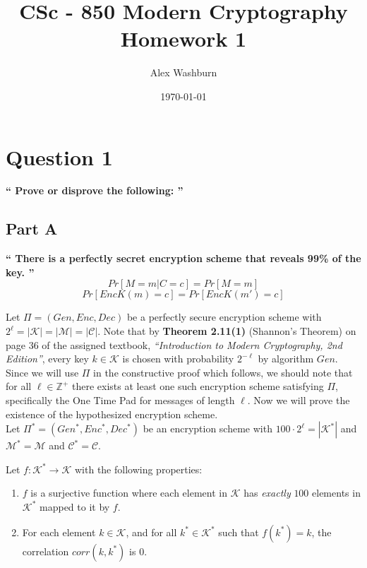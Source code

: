 \documentclass{article}
\title{CSc - 850 Modern Cryptography\\ Homework 1}
\author{Alex Washburn}
\date\today
\newcommand{\HomeworkText}[1]{\textbf{``#1''}\\}
\begin{document}

	\maketitle
	\vspace*{4cm}

	\restoregeometry
	
	\clearpage
	\section*{Question 1}
	\HomeworkText{
		Prove or disprove the following:
	}

	\subsection*{Part A}
	\HomeworkText{
		There is a perfectly secret encryption scheme that reveals 99\% of the key.
	}

    $$Pr[M = m | C = c] = Pr[M = m]$$
    $$Pr[Enc K (m) = c] = Pr[Enc K (m') = c]$$

    Let $\Pi = (Gen,Enc,Dec)$ be a perfectly secure encryption scheme with $2^\ell = |\mathcal{K}| = |\mathcal{M}| = |\mathcal{C}|$.
    Note that by \textbf{Theorem 2.11(1)} (Shannon's Theorem) on page 36 of the assigned textbook, \emph{``Introduction to Modern Cryptography, 2nd Edition''}, every key $k \in \mathcal{K}$ is chosen with probability $2^{-\ell}$ by algorithm $Gen$.
    Since we will use $\Pi$ in the constructive proof which follows, we should note that for all $\ell \in \mathbb{Z}^{+}$ there exists at least one such encryption scheme satisfying $\Pi$, specifically the One Time Pad for messages of length $\ell$.
    Now we will prove the existence of the hypothesized encryption scheme.\\
    
    Let $\Pi^{*} = (Gen^{*},Enc^{*},Dec^{*})$ be an encryption scheme with $100 \cdot2^\ell = |\mathcal{K}^{*}|$ and $\mathcal{M}^{*} = \mathcal{M}$ and $\mathcal{C}^{*} = \mathcal{C}$.
        
    Let $f : \mathcal{K}^{*} \to \mathcal{K}$ with the following properties:
    \begin{enumerate}

    	\item $f$ is a surjective function where each element in $\mathcal{K}$ has \emph{exactly} $100$ elements in $\mathcal{K}^{*}$ mapped to it by $f$.

    	\item For each element $k \in \mathcal{K}$, and for all $k^{*} \in \mathcal{K}^{*}$ such that $f(k^{*}) = k$, the correlation $corr(k,k^*)$ is $0$.
    	 
    \end{enumerate}
    
\end{document}
